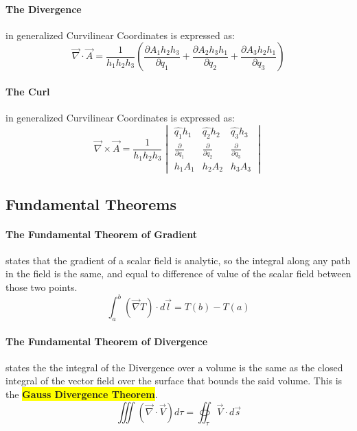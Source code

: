 \paragraph{The Divergence} in generalized Curvilinear Coordinates is expressed as:
\begin{equation}
    \vec{\nabla} \cdot \vec{A} = \frac{1}{h_1 h_2 h_3} (\frac{\partial A_{1} h_2 h_3}{\partial q_1} + \frac{\partial A_{2} h_3 h_1}{\partial q_2} + \frac{\partial A_{3} h_2 h_1}{\partial q_3})
\end{equation}

\paragraph{The Curl} in generalized Curvilinear Coordinates is expressed as:
\begin{equation}
    \vec{\nabla} \times \vec{A} = \frac{1}{h_1 h_2 h_3} 
    \begin{vmatrix}
        \hat{q_1} h_1 & \hat{q_2} h_2 & \hat{q_3} h_3 \\
        \frac{\partial}{\partial q_1} & \frac{\partial}{\partial q_2} & \frac{\partial}{\partial q_3} \\
        h_1 A_1 & h_2 A_2 & h_3 A_3
    \end{vmatrix} 
\end{equation}


\subsection{Fundamental Theorems}

\paragraph{The Fundamental Theorem of Gradient} states that the gradient of a scalar field is analytic, so the integral along any path in the field is the same, and equal to difference of value of the scalar field between those two points.
\begin{equation} \int_a^b (\vec{\nabla} T) \cdot d \vec{l} = T(b) - T(a) \end{equation}

\paragraph{The Fundamental Theorem of Divergence} states the the integral of the Divergence over a volume is the same as the closed integral of the vector field over the surface that bounds the said volume. This is the \colorbox{yellow}{\textbf{Gauss Divergence Theorem}}.
\begin{equation} \iiint (\vec{\nabla} \cdot \vec{V}) d\tau = \oiint_{\tau} \vec{V} \cdot d \vec{s} \end{equation}

